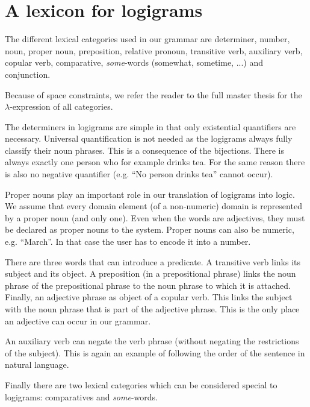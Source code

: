 \section{A lexicon for logigrams}
The different lexical categories used in our grammar are determiner, number, noun, proper noun, preposition, relative pronoun, transitive verb, auxiliary verb, copular verb, comparative, \textit{some}-words (somewhat, sometime, ...) and conjunction.

Because of space constraints, we refer the reader to the full master thesis for the $\lambda$-expression of all categories.

The determiners in logigrams are simple in that only existential quantifiers are necessary. Universal quantification is not needed as the logigrams always fully classify their noun phrases. This is a consequence of the bijections. There is always exactly one person who for example drinks tea. For the same reason there is also no negative quantifier (e.g. ``No person drinks tea'' cannot occur).

Proper nouns play an important role in our translation of logigrams into logic. We assume that every domain element (of a non-numeric) domain is represented by a proper noun (and only one). Even when the words are adjectives, they must be declared as proper nouns to the system.
Proper nouns can also be numeric, e.g. ``March''. In that case the user has to encode it into a number.

There are three words that can introduce a predicate. A transitive verb links its subject and its object. A preposition (in a prepositional phrase) links the noun phrase of the prepositional phrase to the noun phrase to which it is attached. Finally, an adjective phrase as object of a copular verb. This links the subject with the noun phrase that is part of the adjective phrase. This is the only place an adjective can occur in our grammar.


An auxiliary verb can negate the verb phrase (without negating the restrictions of the subject). This is again an example of following the order of the sentence in natural language.


Finally there are two lexical categories which can be considered special to logigrams: comparatives and \textit{some}-words.

